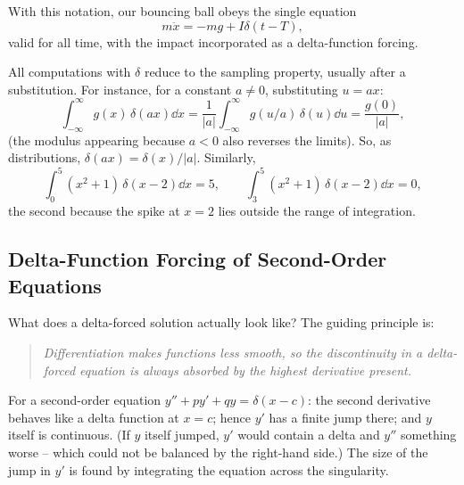With this notation, our bouncing ball obeys the single equation
$$
m \ddot x = -mg + I \delta(t - T),
$$
valid for all time, with the impact incorporated as a delta-function forcing.

\begin{example}
	All computations with $\delta$ reduce to the sampling property, usually after a substitution. For instance, for a constant $a \neq 0$, substituting $u = ax$:
	$$
	\int_{-\infty}^{\infty} g(x) \, \delta(ax) \dd x = \frac{1}{|a|}\int_{-\infty}^\infty g(u/a) \, \delta(u) \dd u = \frac{g(0)}{|a|},
	$$
	(the modulus appearing because $a < 0$ also reverses the limits). So, as distributions, $\delta(ax) = \delta(x)/|a|$. Similarly,
	$$
	\int_0^5 (x^2 + 1)\,\delta(x - 2) \dd x = 5, \qquad \int_3^5 (x^2 + 1)\, \delta(x - 2)\dd x = 0,
	$$
	the second because the spike at $x = 2$ lies outside the range of integration.
\end{example}

\subsection{Delta-Function Forcing of Second-Order Equations}

What does a delta-forced solution actually look like? The guiding principle is:
\begin{quote}
	\emph{Differentiation makes functions less smooth, so the discontinuity in a delta-forced equation is always absorbed by the highest derivative present.}
\end{quote}
For a second-order equation $y'' + p y' + q y = \delta(x - c)$: the second derivative behaves like a delta function at $x = c$; hence $y'$ has a finite jump there; and $y$ itself is continuous. (If $y$ itself jumped, $y'$ would contain a delta and $y''$ something worse -- which could not be balanced by the right-hand side.) The size of the jump in $y'$ is found by integrating the equation across the singularity.

